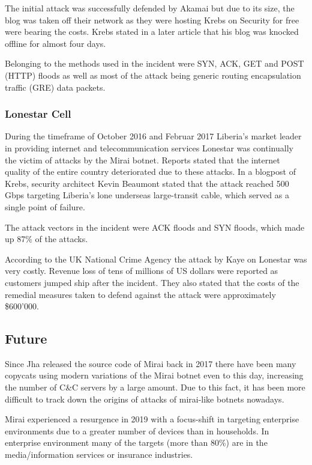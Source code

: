 The initial attack was successfully defended by Akamai but due to its size, the blog was taken off their network as they were hosting Krebs on Security for free were bearing the costs. \cite{Osborne16} Krebs stated in a later article that his blog was knocked offline for almost four days. \cite{Krebs19}

Belonging to the methods used in the incident were SYN, ACK, GET and POST (HTTP) floods as well as most of the attack being generic routing encapsulation traffic (GRE) data packets. \cite{Antonakakis17}

	
		\subsubsection{Lonestar Cell}
		During the timeframe of October 2016 and Februar 2017 Liberia's market leader in providing internet and telecommunication services Lonestar was continually the victim of attacks by the Mirai botnet. Reports stated that the internet quality of the entire country deteriorated due to these attacks. \cite{Antonakakis17} In a blogpost of Krebs, security architect Kevin Beaumont stated that the attack reached 500 Gbps targeting Liberia's lone underseas large-transit cable, which served as a single point of failure. \cite{Krebs16}
	
The attack vectors in the incident were ACK floods and SYN floods, which made up 87\% of the attacks. \cite{Antonakakis17}

According to the UK National Crime Agency the attack by Kaye on Lonestar was very costly. Revenue loss of tens of millions of US dollars were reported as customers jumped ship after the incident. They also stated that the costs of the remedial measures taken to defend against the attack were approximately \$600'000. \cite{Cimpanu19}
	
	\subsection{Future}
Since Jha released the source code of Mirai back in 2017 there have been many copycats using modern variations of the Mirai botnet even to this day, increasing the number of C\&C servers by a large amount. Due to this fact, it has been more difficult to track down the origins of attacks of mirai-like botnets nowadays.

Mirai experienced a resurgence in 2019 with a focus-shift in targeting enterprise environments due to a greater number of devices than in households. In enterprise environment many of the targets (more than 80\%) are in the media/information services or insurance industries. \cite{Lemos19}

